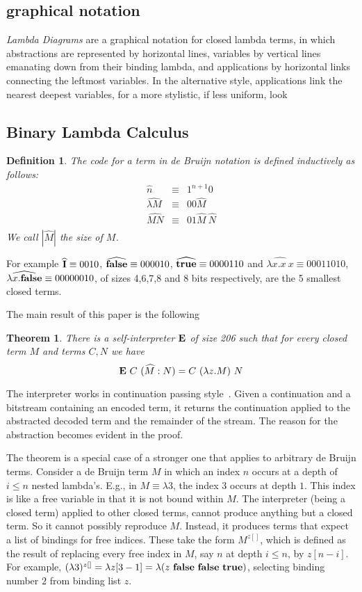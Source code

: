 \documentclass{article}
\newtheorem{theorem}{Theorem}
\newtheorem{definition}{Definition}
\newcommand{\pref}[2]{(#1:#2)}
\newcommand{\idx}[2]{#1[#2]}
\newcommand{\bnd}[2]{#1^{#2[]}}
\newcommand{\Ct}{{\bf true}}
\newcommand{\Cf}{{\bf false}}
\newcommand{\CI}{{\bf I}}
\newcommand{\CE}{{\bf E}}
\begin{document}
\subsection{graphical notation}
{\em Lambda Diagrams} are a graphical notation for closed lambda terms,
in which abstractions are represented by horizontal lines, variables by vertical lines emanating down from their binding lambda, and applications by horizontal links connecting the leftmost variables. In the alternative style, applications link the nearest deepest variables, for a more stylistic, if less uniform, look
\subsection{Binary Lambda Calculus}

\begin{definition}
The code for a term in de Bruijn notation is defined
inductively as follows:
\begin{eqnarray*}
\widehat{n} & \equiv & 1^{n+1} 0 \\
\widehat{\lambda M} & \equiv & 0 0 \widehat{M} \\
\widehat{M N} & \equiv & 0 1 \widehat{M}\ \widehat{N} \\
\end{eqnarray*}
We call $|\widehat{M}|$ the {\em size} of $M$.
\end{definition}

For example
$\widehat{\CI} \equiv 0010$,
$\widehat{\Cf} \equiv 000010$,
$\widehat{\Ct} \equiv 0000110$ and
$\widehat{\lambda x.x\ x} \equiv 00011010$,
$\widehat{\lambda x.\Cf} \equiv 00000010$,
of sizes 4,6,7,8 and 8 bits respectively,
are the 5 smallest closed terms.

The main result of this paper is the following
\begin{theorem}
There is a self-interpreter $\CE$ of size 206
such that for every closed term $M$ and terms $C,N$ we have
\[ \CE\ C\ \pref{\widehat{M}}{N} = C\ (\lambda z.M)\ N \]
\label{int206}
\end{theorem}
The interpreter works in continuation passing style~\cite{fwh}.
Given a continuation and a bitstream containing an encoded term,
it returns the continuation applied to the abstracted decoded term 
and the remainder of the stream. The reason for the abstraction
becomes evident in the proof.

The theorem is a special case of a stronger
one that applies to arbitrary de Bruijn terms.
Consider a de Bruijn term $M$
in which an index $n$ occurs at a depth of
$i \leq n$ nested lambda's. E.g., in $M \equiv \lambda 3$,
the index $3$ occurs at depth $1$. This index is like
a free variable in that it is not bound within $M$.
The interpreter (being a closed term) applied to other closed terms,
cannot produce anything but a closed term. So it cannot possibly
reproduce $M$. Instead, it produces
terms that expect a list of bindings for free indices.
These take the form $\bnd{M}{z}$, which is defined
as the result of replacing every free index in $M$, say $n$
at depth $i\leq n$, by $\idx{z}{n-i}$. 
For example, $\bnd{(\lambda 3)}{z} = \lambda \idx{z}{3-1} =
\lambda (z\ \Cf\ \Cf\ \Ct)$,
selecting binding number $2$ from binding list $z$.
\end{document}

